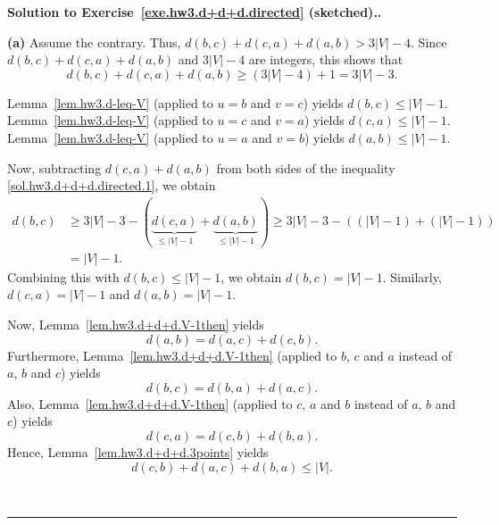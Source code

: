 \documentclass[numbers=enddot,12pt,final,onecolumn,notitlepage]{scrartcl}%
\theoremstyle{definition}
\newenvironment{proof}[1][Proof]{\noindent\textbf{#1.} }{\ \rule{0.5em}{0.5em}}
\newcommand{\abs}[1]{\left| #1 \right|}
\newcommand{\tup}[1]{\left( #1 \right)}
\begin{document}
\begin{proof}[Solution to Exercise~\ref{exe.hw3.d+d+d.directed}
(sketched).]

\textbf{(a)} Assume the contrary.
Thus, $d \tup{b, c} + d \tup{c, a} + d \tup{a, b} > 3 \abs{V} - 4$.
Since $d \tup{b, c} + d \tup{c, a} + d \tup{a, b}$ and
$3 \abs{V} - 4$ are integers, this shows that
\begin{equation}
d \tup{b, c} + d \tup{c, a} + d \tup{a, b}
\geq \tup{3 \abs{V} - 4} + 1
= 3 \abs{V} - 3 .
\label{sol.hw3.d+d+d.directed.1}
\end{equation}

Lemma~\ref{lem.hw3.d-leq-V} (applied to $u = b$ and $v = c$) yields
$d \tup{b, c} \leq \abs{V} - 1$.
Lemma~\ref{lem.hw3.d-leq-V} (applied to $u = c$ and $v = a$) yields
$d \tup{c, a} \leq \abs{V} - 1$.
Lemma~\ref{lem.hw3.d-leq-V} (applied to $u = a$ and $v = b$) yields
$d \tup{a, b} \leq \abs{V} - 1$.

Now, subtracting $d \tup{c, a} + d \tup{a, b}$ from both sides of
the inequality \eqref{sol.hw3.d+d+d.directed.1}, we obtain
\begin{align*}
d \tup{b, c}
&\geq 3 \abs{V} - 3 - \tup{\underbrace{d \tup{c, a}}_{\leq \abs{V} - 1}
                           +
                           \underbrace{d \tup{a, b}}_{\leq \abs{V} - 1}
                          }
\geq 3 \abs{V} - 3 - \tup{\tup{\abs{V} - 1} + \tup{\abs{V} - 1}} \\
&= \abs{V} - 1 .
\end{align*}
Combining this with $d \tup{b, c} \leq \abs{V} - 1$, we obtain
$d \tup{b, c} = \abs{V} - 1$.
Similarly, $d \tup{c, a} = \abs{V} - 1$ and
$d \tup{a, b} = \abs{V} - 1$.

Now, Lemma~\ref{lem.hw3.d+d+d.V-1then} yields
\begin{equation}
d \tup{a, b} = d \tup{a, c} + d \tup{c, b} .
\label{sol.hw3.d+d+d.directed.2ab}
\end{equation}
Furthermore, Lemma~\ref{lem.hw3.d+d+d.V-1then} (applied to $b$, $c$
and $a$ instead of $a$, $b$ and $c$) yields
\begin{equation}
d \tup{b, c} = d \tup{b, a} + d \tup{a, c} .
\label{sol.hw3.d+d+d.directed.2bc}
\end{equation}
Also, Lemma~\ref{lem.hw3.d+d+d.V-1then} (applied to $c$, $a$
and $b$ instead of $a$, $b$ and $c$) yields
\begin{equation}
d \tup{c, a} = d \tup{c, b} + d \tup{b, a} .
\label{sol.hw3.d+d+d.directed.2ca}
\end{equation}
Hence, Lemma~\ref{lem.hw3.d+d+d.3points} yields
\[
d \tup{c, b} + d \tup{a, c} + d \tup{b, a} \leq \abs{V} .
\]


\end{proof}
\end{document}

